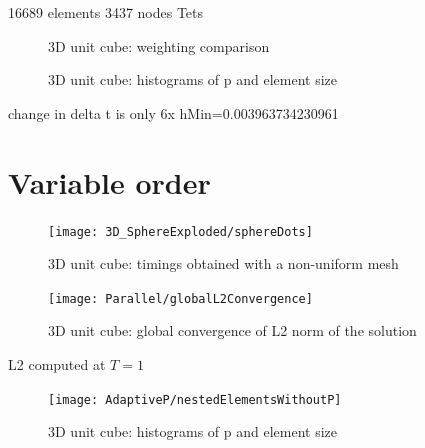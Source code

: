 16689 elements
3437 nodes
Tets
\begin{figure}[!ht]
	\centering
{}
\caption{3D unit cube: weighting comparison}
	\label{fig:unitCubeNonUniformTimings}
\end{figure}
\begin{figure}[!ht]
	\centering
\caption{3D unit cube: histograms of p and element size}
	\label{fig:unitCubeNonUniformTimings}
\end{figure}

change in delta t is only 6x
hMin=0.003963734230961


\section{Variable order}
\begin{figure}[!ht]
	\centering
  \texttt{[image: 3D\_SphereExploded/sphereDots]}
	\caption{3D unit cube: timings obtained with a non-uniform mesh}
	\label{fig:unitCubeNonUniformAdaptiveP}
\end{figure}
\begin{figure}[!ht]
	\centering
\texttt{[image: Parallel/globalL2Convergence]}
\caption{3D unit cube: global convergence of L2 norm of the solution}
	\label{fig:unitCubeNonUniformGlobalAdaptivePL2Conv}
\end{figure}
L2 computed at $T=1$
\begin{figure}[!ht]
	\centering
{}
\end{figure}
\begin{figure}[!ht]
	\centering
  \texttt{[image: AdaptiveP/nestedElementsWithoutP]}
\caption{3D unit cube: histograms of p and element size}
	\label{fig:unitCubeNonUniformTimings}
\end{figure}
